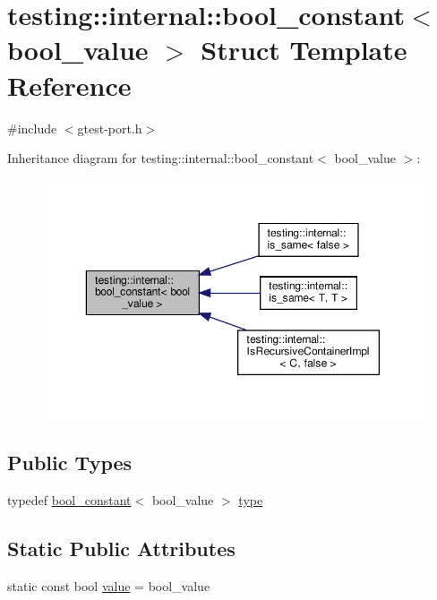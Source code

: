 \hypertarget{structtesting_1_1internal_1_1bool__constant}{}\section{testing\+:\+:internal\+:\+:bool\+\_\+constant$<$ bool\+\_\+value $>$ Struct Template Reference}
\label{structtesting_1_1internal_1_1bool__constant}


{\ttfamily \#include $<$gtest-\/port.\+h$>$}



Inheritance diagram for testing\+:\+:internal\+:\+:bool\+\_\+constant$<$ bool\+\_\+value $>$\+:\nopagebreak
\begin{figure}[H]
\begin{center}
\leavevmode
\includegraphics[width=350pt]{structtesting_1_1internal_1_1bool__constant__inherit__graph}
\end{center}
\end{figure}
\subsection*{Public Types}
\begin{DoxyCompactItemize}
\item 
typedef \hyperlink{structtesting_1_1internal_1_1bool__constant}{bool\+\_\+constant}$<$ bool\+\_\+value $>$ \hyperlink{structtesting_1_1internal_1_1bool__constant_aba6d09ecf7eecea6c93480f0d627a167}{type}
\end{DoxyCompactItemize}
\subsection*{Static Public Attributes}
\begin{DoxyCompactItemize}
\item 
static const bool \hyperlink{structtesting_1_1internal_1_1bool__constant_a499fba6576296b04d99690a486424b32}{value} = bool\+\_\+value
\end{DoxyCompactItemize}


